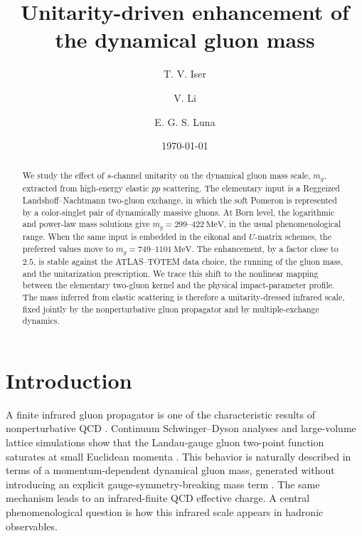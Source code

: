 \documentclass[aps,prd,twocolumn,superscriptaddress,longbibliography,nofootinbib]{revtex4-2}
\newcommand{\MeV}{\mathrm{MeV}}
\begin{document}
\title{Unitarity-driven enhancement of the dynamical gluon mass}

\author{T. V. Iser}

\author{V. Li}

\author{E. G. S. Luna}

\date{\today}


\begin{abstract}
We study the effect of $s$-channel unitarity on the dynamical gluon mass
scale, $m_g$, extracted from high-energy elastic $pp$ scattering.  The
elementary input is a Reggeized Landshoff--Nachtmann two-gluon exchange,
in which the soft Pomeron is represented by a color-singlet pair of
dynamically massive gluons.  At Born level, the logarithmic and power-law
mass solutions give $m_g=299$--$422~\MeV$, in the usual phenomenological
range.  When the same input is embedded in the eikonal and $U$-matrix
schemes, the preferred values move to $m_g=749$--$1101~\MeV$.  The
enhancement, by a factor close to $2.5$, is stable against the
ATLAS--TOTEM data choice, the running of the gluon mass, and the
unitarization prescription.  We trace this shift to the nonlinear mapping
between the elementary two-gluon kernel and the physical
impact-parameter profile.  The mass inferred from elastic scattering is
therefore a unitarity-dressed infrared scale, fixed jointly by the
nonperturbative gluon propagator and by multiple-exchange dynamics.
\end{abstract}

\maketitle

\section{Introduction}

A finite infrared gluon propagator is one of the characteristic results of nonperturbative QCD \cite{binosi1,huber1,roberts1}.  Continuum Schwinger--Dyson analyses and large-volume lattice simulations show that the Landau-gauge gluon two-point function saturates at small Euclidean momenta \cite{AguilarBinosiPapavassiliou2008,CucchieriMendes2008,Bogolubsky2009,OliveiraSilva2012}.  This behavior is naturally described in terms of a momentum-dependent dynamical gluon mass, generated without introducing an explicit gauge-symmetry-breaking mass term \cite{Cornwall1982,AguilarNataleRodrigues2003,AguilarBinosiPapavassiliou2011}.  The same mechanism leads to an infrared-finite QCD effective charge.  A central phenomenological question is how this infrared scale appears in hadronic observables.
\end{document}

